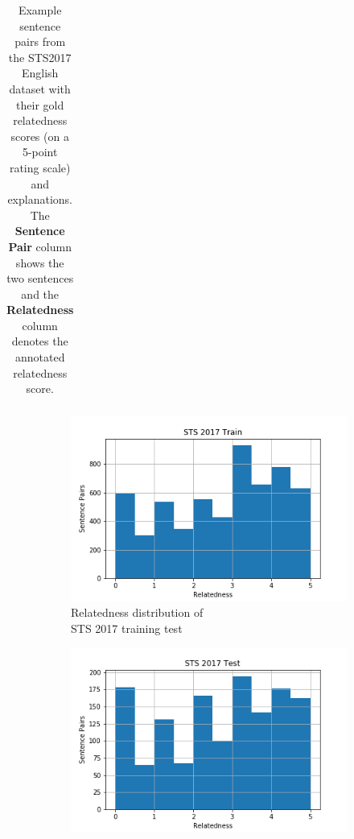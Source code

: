 \begin{enumerate}
\begin{table}[ht!]
\begin{tabular}{l|c}
 	\end{tabular}
 	\caption[Example sentence pairs from the STS2017 English dataset]{Example sentence pairs from the STS2017 English dataset with their gold relatedness scores (on a 5-point rating scale) and explanations. The \textbf{Sentence Pair} column shows the two sentences and the \textbf{Relatedness} column denotes the annotated relatedness score.}
 	\label{tab:sts2017data}
 \end{table} 

\begin{figure}
	\captionsetup[subfigure]{justification=centering}
	\centering
	\begin{subfigure}[b]{.5\textwidth}
		\centering
		\includegraphics[width=\textwidth]{figures/semantic_textual_similarity/introduction/sts_train.png}
		\caption{Relatedness distribution of \\ STS 2017 training test}
		\label{fig:sts_train_relatedness}
	\end{subfigure}%
	\begin{subfigure}[b]{.5\textwidth}
		\centering
		\includegraphics[width=\textwidth]{figures/semantic_textual_similarity/introduction/sts_test.png}

\end{subfigure}
\end{figure}
\end{enumerate}
